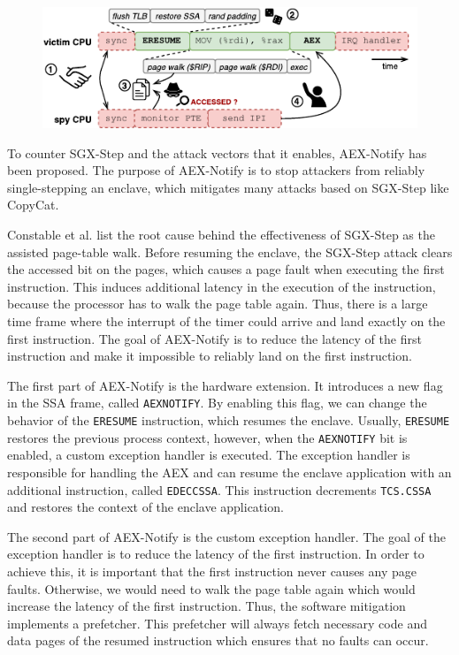 \documentclass{llncs}
\begin{document}
\begin{figure}[t]
  \centering
  \includegraphics{images/sgx-step-pte.pdf}
  \caption{}
  \label{fig:sgx-step-pte}
\end{figure}

To counter SGX-Step and the attack vectors that it enables, AEX-Notify has been proposed.
The purpose of AEX-Notify is to stop attackers from reliably single-stepping an enclave,
which mitigates many attacks based on SGX-Step like CopyCat.

Constable et al. \cite{ConstableBCXXAK23} list the root cause behind the effectiveness of SGX-Step as the assisted page-table walk.
Before resuming the enclave, the SGX-Step attack clears the accessed bit on the pages,
which causes a page fault when executing the first instruction.
This induces additional latency in the execution of the instruction, because
the processor has to walk the page table again.
Thus, there is a large time frame where the interrupt of the timer could
arrive and land exactly on the first instruction.
The goal of AEX-Notify is to reduce the latency of the first instruction
and make it impossible to reliably land on the first instruction.

The first part of AEX-Notify is the hardware extension.
It introduces a new flag in the SSA frame, called \texttt{AEXNOTIFY}.
By enabling this flag, we can change the behavior of the \texttt{ERESUME} instruction,
which resumes the enclave.
Usually, \texttt{ERESUME} restores the previous process context,
however, when the \texttt{AEXNOTIFY} bit is enabled,
a custom exception handler is executed.
The exception handler is responsible for handling the AEX and
can resume the enclave application with an additional instruction, called \texttt{EDECCSSA}.
This instruction decrements \texttt{TCS.CSSA} and restores the context of the enclave application.

The second part of AEX-Notify is the custom exception handler.
The goal of the exception handler is to reduce the latency of the first instruction.
In order to achieve this, it is important that the first instruction never causes any page faults.
Otherwise, we would need to walk the page table again which would increase the latency of the first instruction.
Thus, the software mitigation implements a prefetcher.
This prefetcher will always fetch necessary code and data pages of the resumed
instruction which ensures that no faults can occur.
\end{document}
